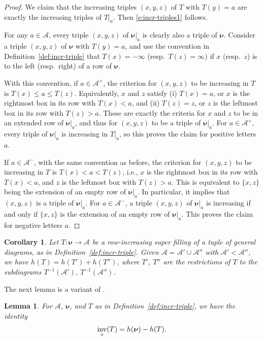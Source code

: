 \documentclass[12pt]{amsart}
\newtheorem{lemma}[thm]{Lemma}
\newtheorem{cor}[thm]{Corollary}
\theoremstyle{definition}
\theoremstyle{remark}
\newcommand{\nubold}{{\boldsymbol \nu }}
\newcommand{\Acal}{{\mathcal A}}
\DeclareMathOperator{\inv}{inv}
\newcommand{\oinv}{\inv _{{\rm o}}}
\begin{document}
\begin{proof}
We claim that the increasing triples $(x,y,z)$ of $T$ with $T(y) = a$
are exactly the increasing triples of $T|_{a}$.  Then
\eqref{e:incr-triples1} follows.

For any $a\in \Acal$, every triple $(x,y,z)$ of $\nubold |_{a}$ is
clearly also a triple of $\nubold $.  Consider a triple $(x,y,z)$ of
$\nubold $ with $T(y) = a$, and use the convention in
Definition~\ref{def:incr-triple} that $T(x) = -\infty $ (resp.\ $T(z)
= \infty $) if $x$ (resp.\ $z$) is to the left (resp.\ right) of a row
of $\nubold $.

With this convention, if $a\in \Acal ^{+}$, the criterion for
$(x,y,z)$ to be increasing in $T$ is $T(x)\leq a\leq T(z)$.
Equivalently, $x$ and $z$ satisfy (i) $T(x) = a$, or $x$ is the
rightmost box in its row with $T(x)<a$, and (ii) $T(z) = z$, or $z$ is
the leftmost box in its row with $T(z)>a$.  These are exactly the
criteria for $x$ and $z$ to be in an extended row of $\nubold |_{a}$,
and thus for $(x,y,z)$ to be a triple of $\nubold |_{a}$.  For $a\in
\Acal ^{+}$, every triple of $\nubold |_{a}$ is increasing in
$T|_{a}$, so this proves the claim for positive letters $a$.

If $a\in \Acal ^{-}$, with the same convention as before, the
criterion for $(x,y,z)$ to be increasing in $T$ is $T(x)< a< T(z)$,
i.e., $x$ is the rightmost box in its row with $T(x)<a$, and $z$ is
the leftmost box with $T(z)>a$.  This is equivalent to $\{x,z \}$
being the extension of an empty row of $\nubold |_{a}$.  In
particular, it implies that $(x,y,z)$ is a triple of $\nubold |_{a}$.
For $a\in \Acal ^{-}$, a triple $(x,y,z)$ of $\nubold |_{a}$ is
increasing if and only if $\{x,z \}$ is the extension of an empty row
of $\nubold |_{a}$.  This proves the claim for negative letters $a$.
\end{proof}


\begin{cor}\label{cor:incr-triples}
Let $T\colon \nubold \rightarrow \Acal $ be a row-increasing super
filling of a tuple of general diagrams, as in
Definition~\ref{def:incr-triple}.  Given $\Acal = \Acal ' \cup \Acal
''$ with $\Acal '< \Acal ''$, we have $h(T) = h(T')+h(T'')$, where
$T'$, $T''$ are the restrictions of $T$ to the subdiagrams
$T^{-1}(\Acal ')$, $T^{-1}(\Acal '')$.
\end{cor}

The next lemma is a variant of \cite[eq.~(132)]{BHMPS25a}.

\begin{lemma}\label{lem:inv-vs-triples}
For $\Acal $, $\nubold $, and $T$ as in
Definition~\ref{def:incr-triple}, we have the identity
\begin{equation}\label{e:inv-vs-triples}
\oinv (T) = h(\nubold ) - h(T).
\end{equation}
\end{lemma}
\end{document}
